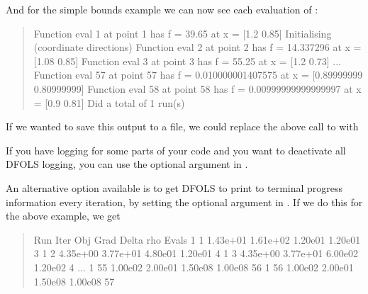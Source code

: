 \documentclass[letterpaper,10pt,english]{sphinxmanual}
\begin{document}
\sphinxAtStartPar
And for the simple bounds example we can now see each evaluation of :
\begin{quote}

\begin{sphinxVerbatim}[commandchars=\\\{\}]
Function eval 1 at point 1 has f = 39.65 at x = [\PYGZhy{}1.2   0.85]
Initialising (coordinate directions)
Function eval 2 at point 2 has f = 14.337296 at x = [\PYGZhy{}1.08  0.85]
Function eval 3 at point 3 has f = 55.25 at x = [\PYGZhy{}1.2   0.73]
...
Function eval 57 at point 57 has f = 0.010000001407575 at x = [0.89999999 0.80999999]
Function eval 58 at point 58 has f = 0.00999999999999997 at x = [0.9  0.81]
Did a total of 1 run(s)
\end{sphinxVerbatim}
\end{quote}

\sphinxAtStartPar
If we wanted to save this output to a file, we could replace the above call to  with
\begin{quote}

\begin{sphinxVerbatim}[commandchars=\\\{\}]
 
                     
\end{sphinxVerbatim}
\end{quote}

\sphinxAtStartPar
If you have logging for some parts of your code and you want to deactivate all DFO\sphinxhyphen{}LS logging, you can use the optional argument  in .

\sphinxAtStartPar
An alternative option available is to get DFO\sphinxhyphen{}LS to print to terminal progress information every iteration, by setting the optional argument  in . If we do this for the above example, we get
\begin{quote}

\begin{sphinxVerbatim}[commandchars=\\\{\}]
 Run  Iter     Obj       Grad     Delta      rho     Evals
  1     1    1.43e+01  1.61e+02  1.20e\PYGZhy{}01  1.20e\PYGZhy{}01    3
  1     2    4.35e+00  3.77e+01  4.80e\PYGZhy{}01  1.20e\PYGZhy{}01    4
  1     3    4.35e+00  3.77e+01  6.00e\PYGZhy{}02  1.20e\PYGZhy{}02    4
...
  1    55    1.00e\PYGZhy{}02  2.00e\PYGZhy{}01  1.50e\PYGZhy{}08  1.00e\PYGZhy{}08   56
  1    56    1.00e\PYGZhy{}02  2.00e\PYGZhy{}01  1.50e\PYGZhy{}08  1.00e\PYGZhy{}08   57
\end{sphinxVerbatim}
\end{quote}
\end{document}
